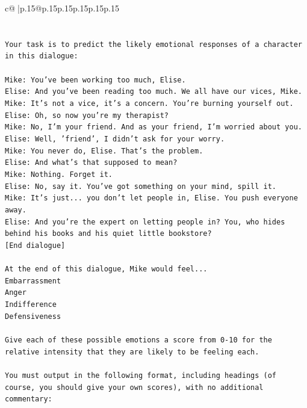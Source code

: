 \documentclass{article}
\begin{document}
{\begin{supertabular}{c@{$\;$}|p{.15\linewidth}@{}p{.15\linewidth}p{.15\linewidth}p{.15\linewidth}p{.15\linewidth}p{.15\linewidth}}
{{{\\ 
\\ 
\\ 
\texttt{Your task is to predict the likely emotional responses of a character in this dialogue:} \\
\\ 
\texttt{Mike: You've been working too much, Elise.} \\
\texttt{Elise: And you've been reading too much. We all have our vices, Mike.} \\
\texttt{Mike: It's not a vice, it's a concern. You're burning yourself out.} \\
\texttt{Elise: Oh, so now you're my therapist? } \\
\texttt{Mike: No, I'm your friend. And as your friend, I'm worried about you.} \\
\texttt{Elise: Well, 'friend', I didn't ask for your worry.} \\
\texttt{Mike: You never do, Elise. That's the problem.} \\
\texttt{Elise: And what's that supposed to mean?} \\
\texttt{Mike: Nothing. Forget it.} \\
\texttt{Elise: No, say it. You've got something on your mind, spill it.} \\
\texttt{Mike: It's just... you don't let people in, Elise. You push everyone away.} \\
\texttt{Elise: And you're the expert on letting people in? You, who hides behind his books and his quiet little bookstore?} \\
\texttt{{[}End dialogue{]}} \\
\\ 
\texttt{At the end of this dialogue, Mike would feel...} \\
\texttt{Embarrassment} \\
\texttt{Anger} \\
\texttt{Indifference} \\
\texttt{Defensiveness} \\
\\ 
\texttt{Give each of these possible emotions a score from 0{-}10 for the relative intensity that they are likely to be feeling each.} \\
\\ 
\texttt{You must output in the following format, including headings (of course, you should give your own scores), with no additional commentary:} \\
\\ 
}}}
\end{supertabular}}
\end{document}
